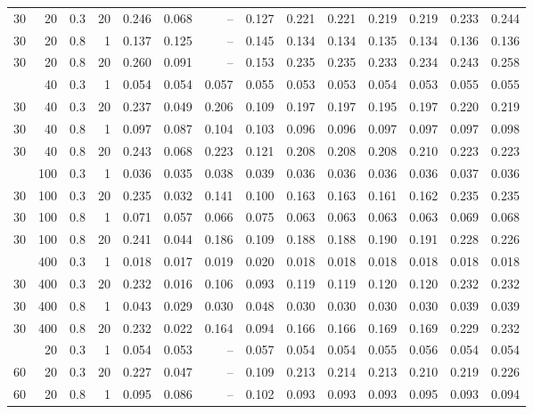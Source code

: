 \begin{tabular}{@{}rrrrrrrrrrrrrr@{}}
30 & 20 & 0.3 & 20 & 0.246 & 0.068 & -- & 0.127 & 0.221 & 0.221 & 0.219 & 0.219 & 0.233 & 0.244 \\
30 & 20 & 0.8 & 1 & 0.137 & 0.125 & -- & 0.145 & 0.134 & 0.134 & 0.135 & 0.134 & 0.136 & 0.136 \\
30 & 20 & 0.8 & 20 & 0.260 & 0.091 & -- & 0.153 & 0.235 & 0.235 & 0.233 & 0.234 & 0.243 & 0.258 \\
\addlinespace[1pt]
30 & 40 & 0.3 & 1 & 0.054 & 0.054 & 0.057 & 0.055 & 0.053 & 0.053 & 0.054 & 0.053 & 0.055 & 0.055 \\
30 & 40 & 0.3 & 20 & 0.237 & 0.049 & 0.206 & 0.109 & 0.197 & 0.197 & 0.195 & 0.197 & 0.220 & 0.219 \\
30 & 40 & 0.8 & 1 & 0.097 & 0.087 & 0.104 & 0.103 & 0.096 & 0.096 & 0.097 & 0.097 & 0.097 & 0.098 \\
30 & 40 & 0.8 & 20 & 0.243 & 0.068 & 0.223 & 0.121 & 0.208 & 0.208 & 0.208 & 0.210 & 0.223 & 0.223 \\
\addlinespace[1pt]
30 & 100 & 0.3 & 1 & 0.036 & 0.035 & 0.038 & 0.039 & 0.036 & 0.036 & 0.036 & 0.036 & 0.037 & 0.036 \\
30 & 100 & 0.3 & 20 & 0.235 & 0.032 & 0.141 & 0.100 & 0.163 & 0.163 & 0.161 & 0.162 & 0.235 & 0.235 \\
30 & 100 & 0.8 & 1 & 0.071 & 0.057 & 0.066 & 0.075 & 0.063 & 0.063 & 0.063 & 0.063 & 0.069 & 0.068 \\
30 & 100 & 0.8 & 20 & 0.241 & 0.044 & 0.186 & 0.109 & 0.188 & 0.188 & 0.190 & 0.191 & 0.228 & 0.226 \\
\addlinespace[1pt]
30 & 400 & 0.3 & 1 & 0.018 & 0.017 & 0.019 & 0.020 & 0.018 & 0.018 & 0.018 & 0.018 & 0.018 & 0.018 \\
30 & 400 & 0.3 & 20 & 0.232 & 0.016 & 0.106 & 0.093 & 0.119 & 0.119 & 0.120 & 0.120 & 0.232 & 0.232 \\
30 & 400 & 0.8 & 1 & 0.043 & 0.029 & 0.030 & 0.048 & 0.030 & 0.030 & 0.030 & 0.030 & 0.039 & 0.039 \\
30 & 400 & 0.8 & 20 & 0.232 & 0.022 & 0.164 & 0.094 & 0.166 & 0.166 & 0.169 & 0.169 & 0.229 & 0.232 \\
\addlinespace[1pt]
60 & 20 & 0.3 & 1 & 0.054 & 0.053 & -- & 0.057 & 0.054 & 0.054 & 0.055 & 0.056 & 0.054 & 0.054 \\
60 & 20 & 0.3 & 20 & 0.227 & 0.047 & -- & 0.109 & 0.213 & 0.214 & 0.213 & 0.210 & 0.219 & 0.226 \\
60 & 20 & 0.8 & 1 & 0.095 & 0.086 & -- & 0.102 & 0.093 & 0.093 & 0.093 & 0.095 & 0.093 & 0.094 \\

\end{tabular}
